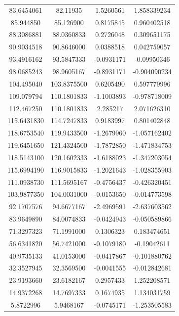 \documentclass[12pt,a4paper,twoside]{report}
\begin{document}
\begin{table}[H]
\begin{tabular}{c c c c}
83.6454061  & 82.11935   & 1.5260561  & 1.858339234 \\
85.944850  & 85.126900   & 0.8175845  & 0.960402518 \\
88.3086881  & 88.0360833  & 0.2726048  & 0.309651175 \\
90.9034518  & 90.8646000  & 0.0388518  & 0.042759057 \\
93.4916162  & 93.5847333  & -0.0931171 & -0.09950346 \\
98.0685243  & 98.9605167  & -0.8931171 & -0.904090234 \\
104.495040  & 103.8375500  & 0.6205490  & 0.597779996 \\
109.079794  & 110.1801833  & -1.1003893 & -0.978718009 \\
112.467250  & 110.1801833  & 2.285217  & 2.071626310 \\
115.6431830 & 114.7247833  & 0.9183997  & 0.801402848 \\
118.6753540 & 119.9433500  & -1.2679960 & -1.057162402 \\
119.6451650 & 121.4324500  & -1.7872850 & -1.471834753 \\
118.5143100 & 120.1602333  & -1.6188023 & -1.347203054 \\
115.6994190 & 116.9015833  & -1.2021643 & -1.028355903 \\
111.0938730 & 111.5695167  & -0.4756437 & -0.426320451 \\
103.9877350 & 104.0031000  & -0.0153650 & -0.014773598 \\
92.1707576  & 94.6677167   & -2.4969591 & -2.637603562 \\
83.9649890  & 84.0074833   & -0.0424943 & -0.050589866 \\
71.3297323  & 71.1991000   & 0.1306323  & 0.183474651 \\
56.6341820  & 56.7421000   & -0.1079180 & -0.19042611 \\
40.9735133  & 41.0153000   & -0.0417867 & -0.101880762 \\
32.3527945  & 32.3569500   & -0.0041555 & -0.012842681 \\
23.9193660  & 23.6182167   & 0.2957433  & 1.252208571 \\
14.9372268  & 14.7697333   & 0.1674935  & 1.134031759 \\
5.8722996   & 5.9468167    & -0.0745171 & -1.253505583 \\

\hline
\end{tabular}

\end{table}
\end{document}
